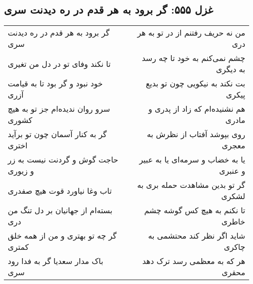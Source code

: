 \begin{center}
\section*{غزل ۵۵۵: گر برود به هر قدم در ره دیدنت سری}
\label{sec:555}
\begin{longtable}{l p{0.5cm} r}
گر برود به هر قدم در ره دیدنت سری
&&
من نه حریف رفتنم از در تو به هر دری
\\
تا نکند وفای تو در دل من تغیری
&&
چشم نمی‌کنم به خود تا چه رسد به دیگری
\\
خود نبود و گر بود تا به قیامت آزری
&&
بت نکند به نیکویی چون تو بدیع پیکری
\\
سرو روان ندیده‌ام جز تو به هیچ کشوری
&&
هم نشنیده‌ام که زاد از پدری و مادری
\\
گر به کنار آسمان چون تو برآید اختری
&&
روی بپوشد آفتاب از نظرش به معجری
\\
حاجت گوش و گردنت نیست به زر و زیوری
&&
یا به خضاب و سرمه‌ای یا به عبیر و عنبری
\\
تاب وغا نیاورد قوت هیچ صفدری
&&
گر تو بدین مشاهدت حمله بری به لشکری
\\
بسته‌ام از جهانیان بر دل تنگ من دری
&&
تا نکنم به هیچ کس گوشه چشم خاطری
\\
گر چه تو بهتری و من از همه خلق کمتری
&&
شاید اگر نظر کند محتشمی به چاکری
\\
باک مدار سعدیا گر به فدا رود سری
&&
هر که به معظمی رسد ترک دهد محقری
\\
\end{longtable}
\end{center}
